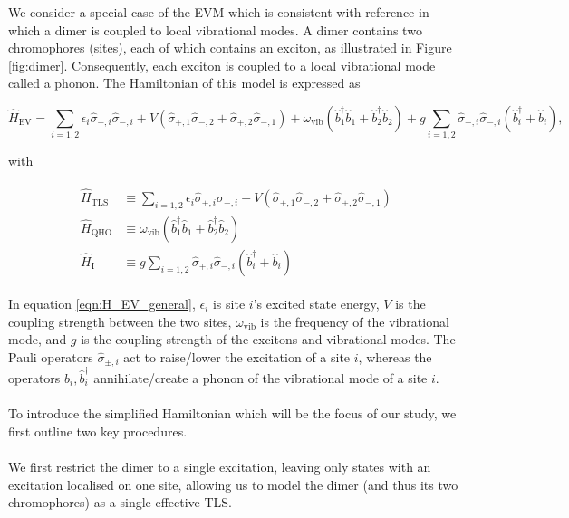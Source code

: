 \documentclass[11pt]{article}
\begin{document}
\noindent We consider a special case of the EVM which is consistent with reference \cite{ExVib2014-Alexandra} in which a dimer is coupled to local vibrational modes. A dimer contains two chromophores (sites), each of which contains an exciton, as illustrated in Figure \ref{fig:dimer}. Consequently, each exciton is coupled to a local vibrational mode called a phonon. The Hamiltonian of this model is expressed as

\begin{equation} \label{eqn:H_EV_general}
    \hat{H}_{\scriptscriptstyle \text{EV}} = \sum_{i=1,2}\epsilon_i\hat{\sigma}_{+,i}\hat{\sigma}_{-,i} + V\left(\hat{\sigma}_{+,1}\hat{\sigma}_{-,2}+\hat{\sigma}_{+,2}\hat{\sigma}_{-,1}\right)
    + \omega_{\scriptscriptstyle \text{vib}} \left(\hat{b}_1^\dagger \hat{b}_1 + \hat{b}_2^\dagger \hat{b}_2\right)
    + g\sum_{i=1,2}\hat{\sigma}_{+,i}\hat{\sigma}_{-,i}\left(\hat{b}_i^\dagger + \hat{b}_i\right),
\end{equation}

with 

\begin{align*}
    \begin{aligned}
        \hat{H}_{\scriptscriptstyle \text{TLS}} &\equiv \sum_{i=1,2}\epsilon_i\hat{\sigma}_{+,i}\hat{\sigma}_{-,i} + V\left(\hat{\sigma}_{+,1}\hat{\sigma}_{-,2}+\hat{\sigma}_{+,2}\hat{\sigma}_{-,1}\right) \\
        \hat{H}_{\scriptscriptstyle \text{QHO}} &\equiv \omega_{\scriptscriptstyle \text{vib}} \left(\hat{b}_1^\dagger \hat{b}_1 + \hat{b}_2^\dagger \hat{b}_2\right) \\
        \hat{H}_{\scriptscriptstyle \text{I}} &\equiv g\sum_{i=1,2}\hat{\sigma}_{+,i}\hat{\sigma}_{-,i}\left(\hat{b}_i^\dagger + \hat{b}_i\right)
    \end{aligned}
\end{align*}

In equation \eqref{eqn:H_EV_general}, $\epsilon_i$ is site $i$'s excited state energy, $V$ is the coupling strength between the two sites, $\omega_{\scriptscriptstyle \text{vib}}$ is the frequency of the vibrational mode, and $g$ is the coupling strength of the excitons and vibrational modes. The Pauli operators $\hat{\sigma}_{\pm,i}$ act to raise/lower the excitation of a site $i$, whereas the operators $\hat{b}_i, \hat{b}_i^\dagger$ annihilate/create a phonon of the vibrational mode of a site $i$.\\
\\
\noindent To introduce the simplified Hamiltonian which will be the focus of our study, we first outline two key procedures.\\
\\
We first restrict the dimer to a single excitation, leaving only states with an excitation localised on one site, allowing us to model the dimer (and thus its two chromophores) as a single effective TLS.
\end{document}
